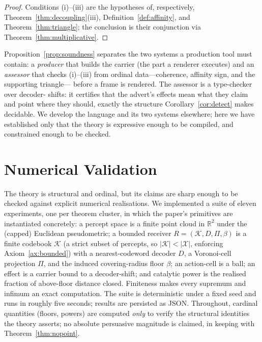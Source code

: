 \documentclass[twocolumn,11pt,a4paper]{article}
\theoremstyle{adv}
\theoremstyle{definition}
\theoremstyle{remark}
\newcommand{\Real}{\mathbb{R}}
\newcommand{\Out}{\mathcal{X}}         %
\newcommand{\Know}{\mathcal{K}}        %
\newcommand{\Dec}{D}                   %
\newcommand{\Proj}{\Pi}                %
\newcommand{\Recv}{R}                  %
\newcommand{\floor}{\beta}            %
\begin{document}
\begin{proof}
Conditions (i)--(iii) are the hypotheses of, respectively,
Theorem~\ref{thm:decoupling}(iii), Definition~\ref{def:affinity}, and
Theorem~\ref{thm:triangle}; the conclusion is their conjunction via
Theorem~\ref{thm:multiplicative}.
\end{proof}

Proposition~\ref{prop:soundness} separates the two systems a production
tool must contain: a \emph{producer} that builds the carrier (the part a
renderer executes) and an \emph{assessor} that checks (i)--(iii) from
ordinal data---coherence, affinity sign, and the supporting triangle---
before a frame is rendered. The assessor is a type-checker over decoder-
shifts: it certifies that the advert's effects mean what they claim and
point where they should, exactly the structure
Corollary~\ref{cor:detect} makes decidable. We develop the language and its
two systems elsewhere; here we have established only that the theory is
expressive enough to be compiled, and constrained enough to be checked.

\section{Numerical Validation}
\label{sec:validation}

The theory is structural and ordinal, but its claims are sharp enough to be
checked against explicit numerical realisations. We implemented a suite of
eleven experiments, one per theorem cluster, in which the paper's primitives
are instantiated concretely: a percept space is a finite point cloud in
$\Real^2$ under the (capped) Euclidean pseudometric; a bounded receiver
$\Recv=(\Know,\Dec,\Proj,\floor)$ is a finite codebook $\Know$ (a strict
subset of percepts, so $|\Know|<|\Out|$, enforcing
Axiom~\ref{ax:bounded}) with a nearest-codeword decoder $\Dec$, a Voronoi-cell
projection $\Proj$, and the induced covering-radius floor $\floor$; an
action-cell is a ball; an effect is a carrier bound to a decoder-shift; and
catalytic power is the realised fraction of above-floor distance closed.
Finiteness makes every supremum and infimum an exact computation. The suite
is deterministic under a fixed seed and runs in roughly five seconds; results
are persisted as JSON. Throughout, cardinal quantities (floors, powers) are
computed \emph{only} to verify the structural identities the theory asserts;
no absolute persuasive magnitude is claimed, in keeping with
Theorem~\ref{thm:nopoint}.
\end{document}
